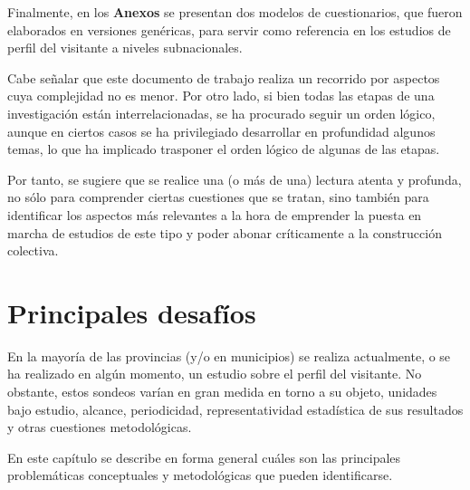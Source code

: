 \documentclass[
]{book}
\begin{document}
Finalmente, en los \textbf{Anexos} se presentan dos modelos de cuestionarios, que fueron elaborados en versiones genéricas, para servir como referencia en los estudios de perfil del visitante a niveles subnacionales.

Cabe señalar que este documento de trabajo realiza un recorrido por aspectos cuya complejidad no es menor. Por otro lado, si bien todas las etapas de una investigación están interrelacionadas, se ha procurado seguir un orden lógico, aunque en ciertos casos se ha privilegiado desarrollar en profundidad algunos temas, lo que ha implicado trasponer el orden lógico de algunas de las etapas.

Por tanto, se sugiere que se realice una (o más de una) lectura atenta y profunda, no sólo para comprender ciertas cuestiones que se tratan, sino también para identificar los aspectos más relevantes a la hora de emprender la puesta en marcha de estudios de este tipo y poder abonar críticamente a la construcción colectiva.

\hypertarget{principales-desafios}{%
\chapter{\texorpdfstring{\textbf{Principales desafíos}}{Principales desafíos}}\label{principales-desafios}}

En la mayoría de las provincias (y/o en municipios) se realiza actualmente, o se ha realizado en algún momento, un estudio sobre el perfil del visitante. No obstante, estos sondeos varían en gran medida en torno a su objeto, unidades bajo estudio, alcance, periodicidad, representatividad estadística de sus resultados y otras cuestiones metodológicas.

En este capítulo se describe en forma general cuáles son las principales problemáticas conceptuales y metodológicas que pueden identificarse.
\end{document}
